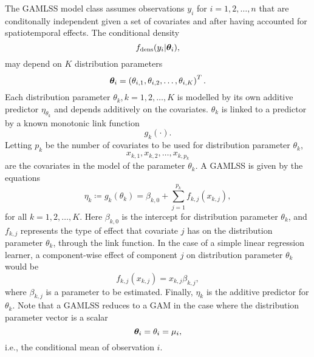 The GAMLSS model class assumes observations $y_i$ for $i=1,2,\ldots,n$ that are conditonally independent given a set of covariates and after having accounted for spatiotemporal effects.
The conditional density
\begin{equation}\label{gamlss-density}
    f_{\text{dens}}(y_i|\boldsymbol{\theta}_i),
\end{equation}
may depend on $K$ distribution parameters
\begin{equation*}
    \boldsymbol{\theta}_i=\left(\theta_{i,1},\theta_{i,2},\ldots,\theta_{i,K}\right)^T.
\end{equation*}
Each distribution parameter $\theta_k,k=1,2,\ldots,K$ is modelled by its own additive predictor $\eta_{\theta_k}$ and depends additively
on the covariates.
$\theta_k$ is linked to a predictor by a known monotonic link function
\begin{equation*}
    g_k(\cdot).
\end{equation*}
Letting $p_k$ be the number of covariates to be used for distribution parameter $\theta_k$,
\begin{equation*}
    x_{k,1},x_{k,2},\ldots,x_{k,p_k}
\end{equation*}
are the covariates in the model of the parameter $\theta_k$.
A GAMLSS is given by the equations
\begin{equation*}
    \eta_k\coloneqq g_k(\theta_k)=\beta_{k,0}+\sum_{j=1}^{p_k}f_{k,j}(x_{k,j}),
\end{equation*}
for all $k=1,2,\ldots,K$. Here $\beta_{k,0}$ is the intercept for distribution parameter $\theta_k$, and $f_{k,j}$ represents the type of effect that covariate $j$ has on the distribution parameter $\theta_k$, through the link function.
In the case of a simple linear regression learner, a component-wise effect of component $j$ on distribution parameter $\theta_k$ would be
\begin{equation*}
    f_{k,j}(x_{k,j})=x_{k,j}\beta_{k,j},
\end{equation*}
where $\beta_{k,j}$ is a parameter to be estimated.
Finally, $\eta_{k}$ is the additive predictor for $\theta_k$.
Note that a GAMLSS reduces to a GAM \citep{gam-book} in the case where the distribution parameter vector is a scalar
\begin{equation*}
    \boldsymbol{\theta}_i=\theta_i=\mu_i,
\end{equation*}
i.e., the conditional mean of observation $i$.


